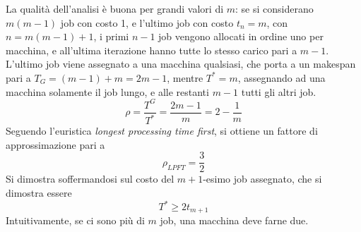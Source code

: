 La qualità dell'analisi è buona per grandi valori di $m$:
se si considerano $
m(m-1)
$ job con costo 1, e l'ultimo job con costo $
t_n = m
$, con $
n = 
m(m-1) + 1
$, i primi $n-1$ job vengono allocati in ordine uno per macchina, e all'ultima iterazione hanno tutte lo stesso carico pari a $m-1$.
L'ultimo job viene assegnato a una macchina qualsiasi, che porta a un makespan pari a $
T_G = (m-1)+m = 2m -1
$, mentre $T^* = m$, assegnando ad una macchina solamente il job lungo, e alle restanti $m-1$ tutti gli altri job.
\begin{equation*}
    \rho = \frac{
        T^G
    }{
        T^*
    }
    = \frac{2m-1}{m}
    = 2- \frac{1}{m}
\end{equation*}
Seguendo l'euristica \emph{longest processing time first}, si ottiene un fattore di approssimazione pari a 
\begin{equation*}
    \rho_{LPFT} = \frac{3}{2}
\end{equation*}
Si dimostra soffermandosi sul costo del $m+1$-esimo job assegnato, che si dimostra essere
\begin{equation*}
    T^* \geq 2 t_{m+1}
\end{equation*}
Intuitivamente, se ci sono più di $m$ job, una macchina deve farne due.

